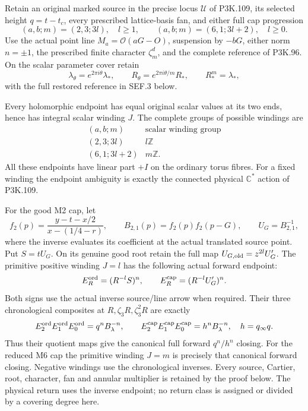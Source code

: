 \begin{theorem}\label{night:P3K.110}
Retain an original marked source in the precise locus
\(\mathcal U\) of P3K.109, its selected height \(q=t-t_c\),
every prescribed lattice-basis fan, and either full cap progression
\[
 (a,b;m)=(2,3;3l),\quad l\ge1,
 \qquad (a,b;m)=(6,1;3l+2),\quad l\ge0.
\]
Use the actual point line \(M_a=\mathcal O(aG-O)\), suspension
by \(-bG\), either norm \(n=\pm1\), the prescribed finite
character \(\zeta_m^d\), and the complete reference of P3K.96.
On the scalar parameter cover retain
\[
 \lambda_\theta=e^{2\pi i\theta}\lambda_*,\qquad
 R_\theta=e^{2\pi i\theta/m}R_*,\qquad R_*^m=\lambda_*,
\]
with the full restored reference in SEF.3 below.

Every holomorphic endpoint has equal original scalar values at its
two ends, hence has integral scalar winding \(J\). The complete
groups of possible windings are
\[
 \begin{array}{c|c}
 (a,b;m)&\text{scalar winding group}\\\hline
 (2,3;3l)&l\mathbb Z\\
 (6,1;3l+2)&m\mathbb Z.
 \end{array}
\]
All these endpoints have linear part \(+I\) on the ordinary
torus fibres. For a fixed winding the endpoint ambiguity is exactly
the connected physical \(\mathbb C^*\) action of P3K.109.

For the good M2 cap, let
\[
 f_2(p)=\frac{y-t-x/2}{x-(1/4-r)},\qquad
 B_{2,1}(p)=f_2(p)f_2(p-G),\qquad U_G=B_{2,1}^{-1},
\]
where the inverse evaluates its coefficient at the actual translated
source point. Put \(S=tU_G\). On its genuine good root retain
the full map \(U_{G,\rm old}=z^{2l}U'_G\). The primitive
positive winding \(J=l\) has the following actual forward endpoint:
\[
 E_R^{\rm ord}=(R^{-l}S)^n,\qquad
 E_R^{\rm cap}=(R^{-l}U'_G)^n.
\]
Both signs use the actual inverse source/line arrow when required.
Their three chronological composites at
\(R,\zeta_3R,\zeta_3^2R\) are exactly
\[
 E_2^{\rm ord}E_1^{\rm ord}E_0^{\rm ord}
       =q^nB_\lambda^{-n},\qquad
 E_2^{\rm cap}E_1^{\rm cap}E_0^{\rm cap}
       =h^nB_\lambda^{-n},\quad h=q_\infty q.
\]
Thus their quotient maps give the canonical full forward
\(q^n/h^n\) closing. For the reduced M6 cap the primitive winding
\(J=m\) is precisely that canonical forward closing. Negative
windings use the chronological inverses. Every source, Cartier,
root, character, fan and annular multiplier is retained by the
proof below. The physical return uses the inverse endpoint;
no return class is assigned or divided by a covering degree here.
\end{theorem}
